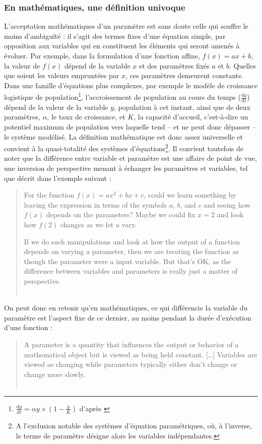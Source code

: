 \subsubsection{En mathématiques, une définition univoque}
L'acceptation mathématiques d'un paramètre est sans doute celle qui souffre le moins d'ambiguïté : il s'agit des termes fixes d'une équation simple, par opposition aux variables qui en constituent les éléments qui seront amenés à évoluer.
Par exemple, dans la formulation d'une fonction affine, $f(x) = ax + b$, la valeur de $f(x)$ dépend de la variable $x$ et des paramètres fixés $a$ et $b$.
Quelles que soient les valeurs empruntées par $x$, ces paramètres demeurent constants. Dans une famille d'équations plus complexes, par exemple le modèle de croissance logistique de population\footnote{
	$\frac{\text{d}y}{\text{d}t} = \alpha y \times (1 - \frac{y}{K})$ d'après \autocite{verhulst1838notice}
}, l'accroissement de population au cours du temps ($\frac{\text{d}y}{\text{d}t}$) dépend de la valeur de la variable $y$, population à cet instant, ainsi que de deux paramètres, $\alpha$, le taux de croissance, et $K$, la \og capacité d'accueil\fg{}, c'est-à-dire un potentiel maximum de population vers laquelle tend -- et ne peut donc dépasser -- le système modélisé.
La définition mathématique est donc assez universelle et convient à la quasi-totalité des systèmes d'équations\footnote{A l'exclusion notable des systèmes d'équation paramétriques, où, à l'inverse, le terme de paramètre désigne alors les variables indépendantes.}.
Il convient toutefois de noter que la différence entre variable et paramètre est une affaire de point de vue, une inversion de perspective menant à échanger les paramètres et variables, tel que décrit dans l'exemple suivant :
\begin{quote}
	\og For the function $f(x)=ax^2+bx+c$, could we learn something by leaving the expression in terms of the symbols $a$, $b$, and $c$ and seeing how $f(x)$ depends on the parameters? Maybe we could fix $x=2$ and look how $f(2)$ changes as we let $a$ vary.
	
	If we do such manipulations and look at how the output of a function depends on varying a parameter, then we are treating the function as though the parameter were a input variable. But that's OK, as the difference between variables and parameters is really just a matter of perspective.\fg{}\\
	\mbox{}~ \hfill \autocite{nykamp_function_2015}
\end{quote}
On peut donc en retenir qu'en mathématiques, ce qui différencie la variable du paramètre est l'aspect fixe de ce dernier, au moins pendant la durée d'exécution d'une fonction : 
\begin{quote}
	\og{}A parameter is a quantity that influences the output or behavior of a mathematical object but is viewed as being held constant. [\dots]
	Variables are viewed as changing while parameters typically either don't change or change more slowly.\fg{}\\
	\mbox{}~ \hfill \autocite{nykamp_parameter_2015}
\end{quote}

